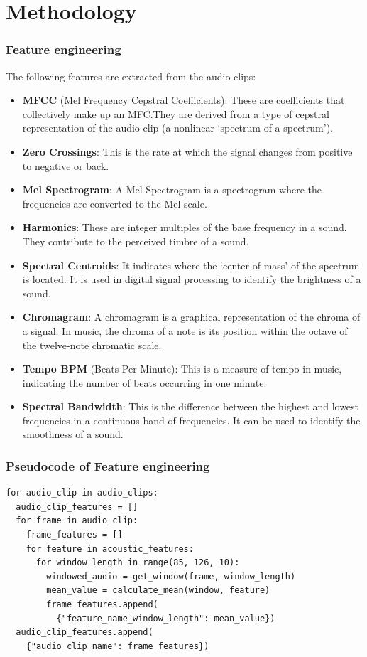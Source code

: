 \documentclass{beamer}
\newcounter{cont}
\begin{document}
\section{Methodology}
\begin{frame}[allowframebreaks]
\frametitle{Feature engineering}
The following features are extracted from the audio clips:
  \begin{itemize}
    \item \textbf{MFCC} (Mel Frequency Cepstral Coefficients): These are coefficients that collectively make up an MFC.\@ They are derived from a type of cepstral representation of the audio clip (a nonlinear `spectrum-of-a-spectrum').
    \item \textbf{Zero Crossings}: This is the rate at which the signal changes from positive to negative or back.
    \item \textbf{Mel Spectrogram}: A Mel Spectrogram is a spectrogram where the frequencies are converted to the Mel scale.
    \item \textbf{Harmonics}: These are integer multiples of the base frequency in a sound. They contribute to the perceived timbre of a sound.
    \item \textbf{Spectral Centroids}: It indicates where the `center of mass' of the spectrum is located. It is used in digital signal processing to identify the brightness of a sound.
    \item \textbf{Chromagram}: A chromagram is a graphical representation of the chroma of a signal. In music, the chroma of a note is its position within the octave of the twelve-note chromatic scale.
    \item \textbf{Tempo BPM} (Beats Per Minute): This is a measure of tempo in music, indicating the number of beats occurring in one minute.
    \item \textbf{Spectral Bandwidth}: This is the difference between the highest and lowest frequencies in a continuous band of frequencies. It can be used to identify the smoothness of a sound.
  \end{itemize}
\end{frame}

\begin{frame}
\frametitle{Pseudocode of Feature engineering}
  \begin{verbatim}
for audio_clip in audio_clips:
  audio_clip_features = []
  for frame in audio_clip:
    frame_features = []
    for feature in acoustic_features:
      for window_length in range(85, 126, 10):
        windowed_audio = get_window(frame, window_length)
        mean_value = calculate_mean(window, feature)
        frame_features.append(
          {"feature_name_window_length": mean_value})
  audio_clip_features.append(
    {"audio_clip_name": frame_features})
  \end{verbatim}
\end{frame}
\end{document}
